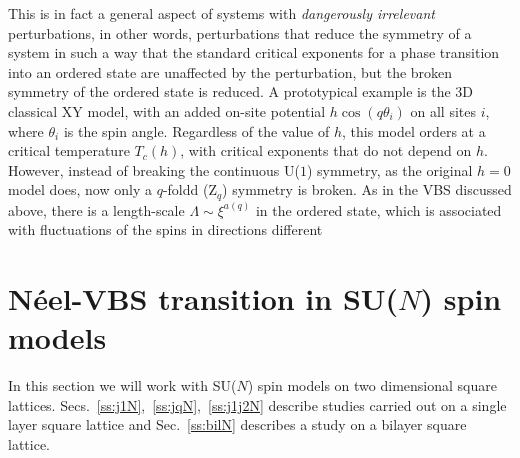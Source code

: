 \documentclass[range]{ar2e}
\begin{document}
This is in fact a general aspect of systems with {\it dangerously irrelevant} perturbations, in other words, perturbations that reduce the symmetry of a system
in such a way that the standard critical exponents for a phase transition into an ordered state are unaffected by the perturbation, but the broken symmetry
of the ordered state is reduced. A prototypical example is the 3D classical XY model, with an added on-site potential $h\cos(q\theta_i)$ on all sites $i$, 
where $\theta_i$ is the spin angle. Regardless of the value of $h$, this model orders at a critical temperature $T_c(h)$, with critical exponents that do
not depend on $h$. However, instead of breaking the continuous U($1$) symmetry, as the original $h=0$ model does, now only a $q$-foldd (Z$_q$) symmetry is
broken. As in the VBS discussed above, there is a length-scale $\Lambda \sim \xi^{a(q)}$ in the ordered state, which is associated with fluctuations of
the spins in directions different


\section{N\'eel-VBS transition in SU($N$) spin models}
\label{sec:sunmodels}

In this section we will work with SU($N$) spin models on two
dimensional  square
lattices. Secs.~\ref{ss:j1N},~\ref{ss:jqN},~\ref{ss:j1j2N} describe
studies carried out on a single layer square lattice and
Sec.~\ref{ss:bilN} describes a study on a bilayer square
lattice. 
\end{document}
